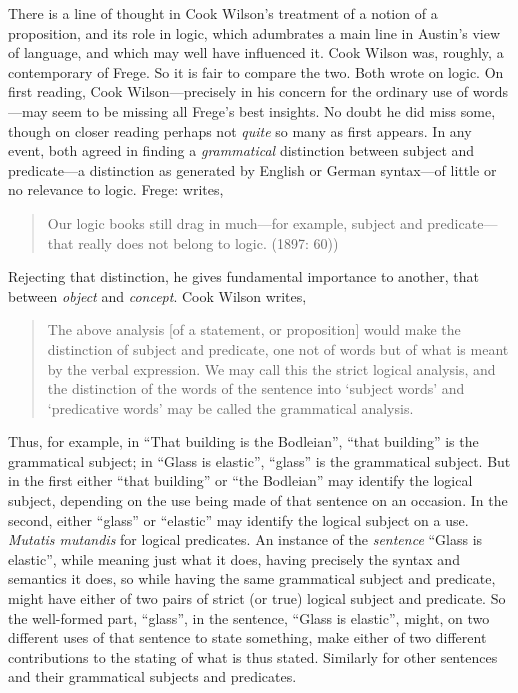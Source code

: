 There is a line of thought in Cook Wilson’s treatment of a notion of a proposition, and its role in logic, which adumbrates a main line in Austin’s view of language, and which may well have influenced it. Cook Wilson was, roughly, a contemporary of Frege. So it is fair to compare the two. Both wrote on logic. On first reading, Cook Wilson---precisely in his concern for the ordinary use of words---may seem to be missing all Frege’s best insights. No doubt he did miss some, though on closer reading perhaps not \emph{quite} so many as first appears. In any event, both agreed in finding a \emph{grammatical} distinction between subject and predicate---a distinction as generated by English or German syntax---of little or no relevance to logic. Frege: writes,
\begin{quote}
	Our logic books still drag in much---for example, subject and predicate---that really does not belong to logic. (1897: 60))
\end{quote}
Rejecting that distinction, he gives fundamental importance to another, that between \emph{object} and \emph{concept}. Cook Wilson writes,
\begin{quote}
	The above analysis [of a statement, or proposition] would make the distinction of subject and predicate, one not of words but of what is meant by the verbal expression. We may call this the strict logical analysis, and the distinction of the words of the sentence into `subject words' and `predicative words' may be called the grammatical analysis. \citep[124]{Cook-Wilson:1926sf}
\end{quote}
Thus, for example, in ``That building is the Bodleian'', ``that building'' is the grammatical subject; in ``Glass is elastic'', ``glass'' is the grammatical subject. But in the first either ``that building'' or ``the Bodleian'' may identify the logical subject, depending on the use being made of that sentence on an occasion. In the second, either ``glass'' or ``elastic'' may identify the logical subject on a use. \emph{Mutatis mutandis} for logical predicates. An instance of the \emph{sentence} ``Glass is elastic'', while meaning just what it does, having precisely the syntax and semantics it does, so while having the same grammatical subject and predicate, might have either of two pairs of strict (or true) logical subject and predicate. So the well-formed part, ``glass'', in the sentence, ``Glass is elastic'', might, on two different uses of that sentence to state something, make either of two different contributions to the stating of what is thus stated. Similarly for other sentences and their grammatical subjects and predicates.

